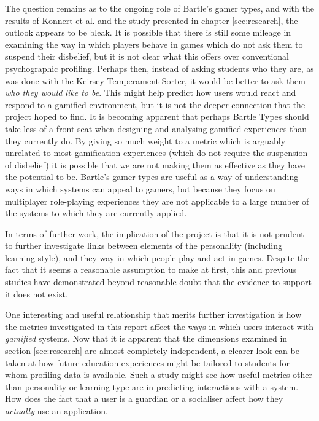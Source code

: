 \documentclass[12pt,a4paper,twoside]{report}
\begin{document}
The question remains as to the ongoing role of Bartle's gamer types, and with the results of Konnert et al. \cite{konertmodeling} and the study presented in chapter \ref{sec:research}, the outlook appears to be bleak. It is possible that there is still some mileage in examining the way in which players behave in games which do not ask them to suspend their disbelief, but it is not clear what this offers over conventional psychographic profiling. Perhaps then, instead of asking students who they are, as was done with the Keirsey Temperament Sorter, it would be better to ask them \textit{who they would like to be}. This might help predict how users would react and respond to a gamified environment, but it is not the deeper connection that the project hoped to find. It is becoming apparent that perhaps Bartle Types should take less of a front seat when designing and analysing gamified experiences than they currently do. By giving so much weight to a metric which is arguably unrelated to most gamification experiences (which do not require the suspension of disbelief) it is possible that we are not making them as effective as they have the potential to be. Bartle's gamer types are useful as a way of understanding ways in which systems can appeal to gamers, but because they focus on multiplayer role-playing experiences they are not applicable to a large number of the systems to which they are currently applied.

In terms of further work, the implication of the project is that it is not prudent to further investigate links between elements of the personality (including learning style), and they way in which people play and act in games. Despite the fact that it seems a reasonable assumption to make at first, this and previous studies have demonstrated beyond reasonable doubt that the evidence to support it does not exist.

One interesting and useful relationship that merits further investigation is how the metrics investigated in this report affect the ways in which users interact with \textit{gamified} systems. Now that it is apparent that the dimensions examined in section \ref{sec:research} are almost completely independent, a clearer look can be taken at how future education experiences might be tailored to students for whom profiling data is available. Such a study might see how useful metrics other than personality or learning type are in predicting interactions with a system. How does the fact that a user is a guardian or a socialiser affect how they \textit{actually} use an application.
\end{document}
